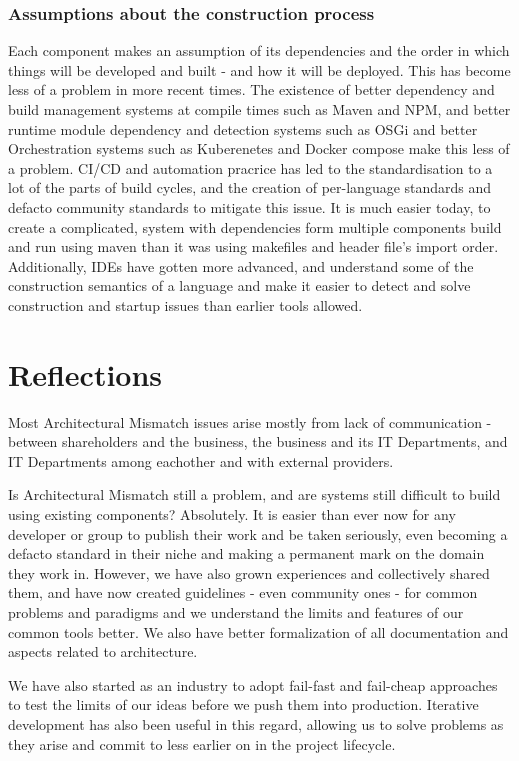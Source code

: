 \documentclass[14pt]{article}
\begin{document}
\subsubsection{Assumptions about the construction process}
Each component makes an assumption of its dependencies and the order in which things will be developed and built - and how it will be deployed. 
This has become less of  a problem in more recent times. The existence of better dependency and build management systems at compile times such as Maven and NPM, and better runtime module dependency and detection systems such as OSGi and better Orchestration systems such as Kuberenetes and Docker compose make this less of a problem. CI/CD and automation pracrice has led to the standardisation to a lot of the parts of  build cycles, and the creation of per-language standards and defacto community standards to mitigate this issue. It is much easier today, to create a complicated, system with dependencies form multiple components build and run using maven than it was using makefiles and header file's import order. Additionally, IDEs have gotten more advanced, and understand some of the construction semantics of a language and make it easier to detect and solve construction and startup issues than earlier tools allowed.
\newpage
\section{Reflections}

Most Architectural Mismatch issues arise mostly from lack of communication - between shareholders and the business, the business and its IT Departments, and IT Departments among eachother and with external providers.

Is Architectural Mismatch still a problem, and are systems still difficult to build using existing components? Absolutely. It is easier than 
ever now for any developer or group to publish their work and be taken seriously, even becoming a defacto standard in their niche and making a permanent mark on the domain they work in. However, we have also grown experiences and collectively shared them, and have now created guidelines - even community ones - for common problems and paradigms and we understand the limits and features of our common tools better. We also have better formalization of all documentation and aspects related to architecture. 

We have also started as an industry to adopt fail-fast and fail-cheap approaches to test the limits of our ideas before we push them into production. Iterative development has also been useful in this regard, allowing us to solve problems as they arise and commit to less earlier on in the project lifecycle. 
\end{document}
